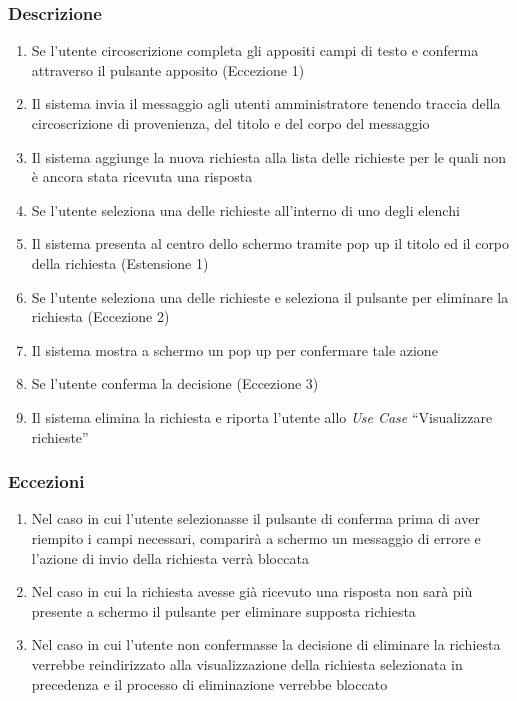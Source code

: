         \subsubsection{Descrizione}
            \begin{enumerate}
                \item Se l'utente circoscrizione completa gli appositi campi di testo e conferma attraverso il pulsante apposito (Eccezione 1)
                \item Il sistema invia il messaggio agli utenti amministratore tenendo traccia della circoscrizione di provenienza, del titolo e del corpo del messaggio
                \item Il sistema aggiunge la nuova richiesta alla lista delle richieste per le quali non è ancora stata ricevuta una risposta
                \item Se l'utente seleziona una delle richieste all'interno di uno degli elenchi
                \item Il sistema presenta al centro dello schermo tramite pop up il titolo ed il corpo della richiesta (Estensione 1)
                \item Se l'utente seleziona una delle richieste e seleziona il pulsante per eliminare la richiesta (Eccezione 2)
                \item Il sistema mostra a schermo un pop up per confermare tale azione
                \item Se l'utente conferma la decisione (Eccezione 3)
                \item Il sistema elimina la richiesta e riporta l'utente allo \textit{Use Case} ``Visualizzare richieste''
            \end{enumerate}
        \subsubsection{Eccezioni}
            \begin{enumerate}
                \item Nel caso in cui l'utente selezionasse il pulsante di conferma prima di aver riempito i campi necessari, comparirà a schermo un messaggio di errore e l'azione di invio della richiesta verrà bloccata
                \item Nel caso in cui la richiesta avesse già ricevuto una risposta non sarà più presente a schermo il pulsante per eliminare supposta richiesta
                \item Nel caso in cui l'utente non confermasse la decisione di eliminare la richiesta verrebbe reindirizzato alla visualizzazione della richiesta selezionata in precedenza e il processo di eliminazione verrebbe bloccato
            \end{enumerate}
